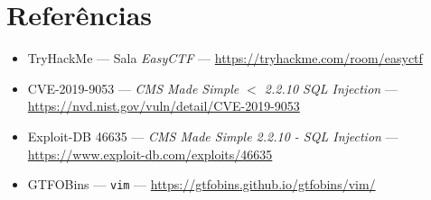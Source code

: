 \documentclass[12pt,a4paper]{article}
\begin{document}
\section{Referências}
\begin{itemize}[leftmargin=1.5em]
  \item TryHackMe --- Sala \emph{EasyCTF} ---
        \url{https://tryhackme.com/room/easyctf}
  \item CVE-2019-9053 --- \emph{CMS Made Simple $<$ 2.2.10 SQL Injection} ---
        \url{https://nvd.nist.gov/vuln/detail/CVE-2019-9053}
  \item Exploit-DB 46635 --- \emph{CMS Made Simple 2.2.10 - SQL Injection} ---
        \url{https://www.exploit-db.com/exploits/46635}
  \item GTFOBins --- \texttt{vim} ---
        \url{https://gtfobins.github.io/gtfobins/vim/}
\end{itemize}
\end{document}
